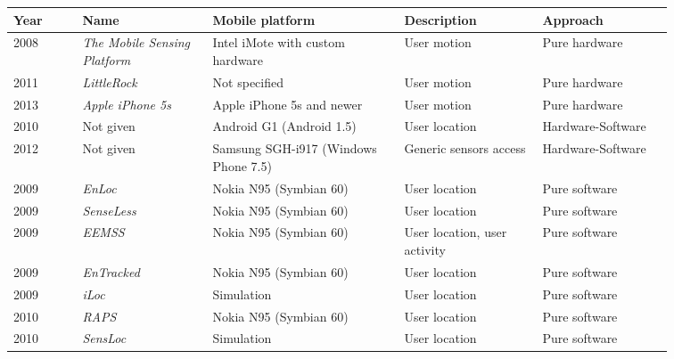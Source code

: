 \begin{table*}
    \centering
    \scriptsize{}
    
    \begin{tabular}{C{0.09\linewidth}C{0.17\linewidth}C{0.25\linewidth}C{0.18\linewidth}C{0.17\linewidth}}
    \toprule
    \textbf{Year} & \textbf{Name} & \textbf{Mobile platform} & \textbf{Description} & \textbf{Approach} \\
    \midrule
    \cite{Choudhury2008} 2008 & \emph{The Mobile Sensing Platform} & Intel iMote with custom hardware & User motion & Pure hardware \\
    \cmidrule(l){1-5}
    \cite{Priyantha2011} 2011 & \emph{LittleRock} & Not specified & User motion & Pure hardware \\
    \cmidrule(l){1-5}
    \cite{Apple2015} 2013 & \emph{Apple iPhone 5s} & Apple iPhone 5s and newer & User motion & Pure hardware \\
    \cmidrule(l){1-5}
    \cite{Zhuang2010} 2010 & Not given & Android G1 (Android 1.5) & User location & Hardware-Software \\
    \cmidrule(l){1-5}
    \cite{Ra2012} 2012 & Not given & Samsung SGH-i917 (Windows Phone 7.5) & Generic sensors access & Hardware-Software \\
    \cmidrule(l){1-5}
    \cite{Constandache2009} 2009 & \emph{EnLoc} & Nokia N95 (Symbian 60) & User location & Pure software \\
    \cmidrule(l){1-5}
    \cite{Abdesslem2009} 2009 & \emph{SenseLess} & Nokia N95 (Symbian 60) & User location & Pure software \\
    \cmidrule(l){1-5}
    \cite{Wang2009} 2009 & \emph{EEMSS} & Nokia N95 (Symbian 60) & User location, user activity & Pure software \\
    \cmidrule(l){1-5}
    \cite{Kjaergaard2009} 2009 & \emph{EnTracked} & Nokia N95 (Symbian 60) & User location & Pure software \\
    \cmidrule(l){1-5}
    \cite{MaY2009} 2009 & \emph{iLoc} & Simulation & User location & Pure software \\
    \cmidrule(l){1-5}
    \cite{Paek2010} 2010 & \emph{RAPS} & Nokia N95 (Symbian 60) & User location & Pure software \\
    \cmidrule(l){1-5}
    \cite{Kim2010} 2010 & \emph{SensLoc} & Simulation & User location & Pure software \\

\end{tabular}
\end{table*}
